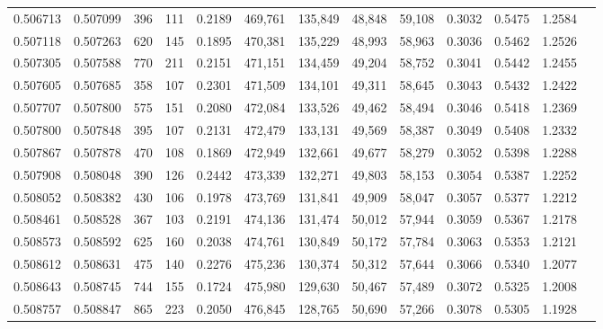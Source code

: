 \begin{tabular}{rrrrrrrrrrrrr}
0.506713 & 0.507099 &   396 &   111 &                                     0.2189 & 469,761 & 135,849 &  48,848 &  59,108 & 0.3032 & 0.5475 & 1.2584 \\
0.507118 & 0.507263 &   620 &   145 &                                     0.1895 & 470,381 & 135,229 &  48,993 &  58,963 & 0.3036 & 0.5462 & 1.2526 \\
0.507305 & 0.507588 &   770 &   211 &                                     0.2151 & 471,151 & 134,459 &  49,204 &  58,752 & 0.3041 & 0.5442 & 1.2455 \\
0.507605 & 0.507685 &   358 &   107 &                                     0.2301 & 471,509 & 134,101 &  49,311 &  58,645 & 0.3043 & 0.5432 & 1.2422 \\
0.507707 & 0.507800 &   575 &   151 &                                     0.2080 & 472,084 & 133,526 &  49,462 &  58,494 & 0.3046 & 0.5418 & 1.2369 \\
0.507800 & 0.507848 &   395 &   107 &                                     0.2131 & 472,479 & 133,131 &  49,569 &  58,387 & 0.3049 & 0.5408 & 1.2332 \\
0.507867 & 0.507878 &   470 &   108 &                                     0.1869 & 472,949 & 132,661 &  49,677 &  58,279 & 0.3052 & 0.5398 & 1.2288 \\
0.507908 & 0.508048 &   390 &   126 &                                     0.2442 & 473,339 & 132,271 &  49,803 &  58,153 & 0.3054 & 0.5387 & 1.2252 \\
0.508052 & 0.508382 &   430 &   106 &                                     0.1978 & 473,769 & 131,841 &  49,909 &  58,047 & 0.3057 & 0.5377 & 1.2212 \\
0.508461 & 0.508528 &   367 &   103 &                                     0.2191 & 474,136 & 131,474 &  50,012 &  57,944 & 0.3059 & 0.5367 & 1.2178 \\
0.508573 & 0.508592 &   625 &   160 &                                     0.2038 & 474,761 & 130,849 &  50,172 &  57,784 & 0.3063 & 0.5353 & 1.2121 \\
0.508612 & 0.508631 &   475 &   140 &                                     0.2276 & 475,236 & 130,374 &  50,312 &  57,644 & 0.3066 & 0.5340 & 1.2077 \\
0.508643 & 0.508745 &   744 &   155 &                                     0.1724 & 475,980 & 129,630 &  50,467 &  57,489 & 0.3072 & 0.5325 & 1.2008 \\
0.508757 & 0.508847 &   865 &   223 &                                     0.2050 & 476,845 & 128,765 &  50,690 &  57,266 & 0.3078 & 0.5305 & 1.1928 \\

\end{tabular}
